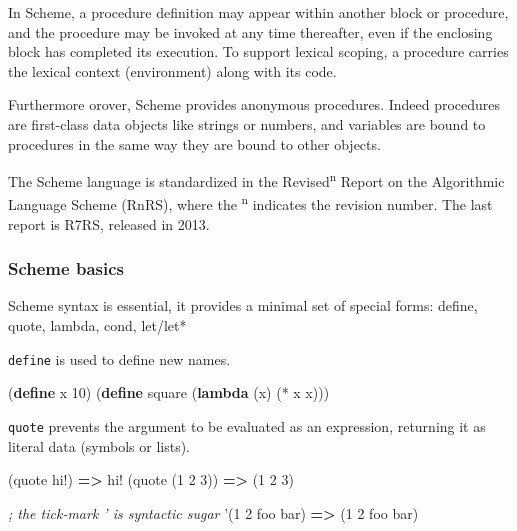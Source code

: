 \documentclass[12pt,a4paper,oneside,openright]{book}
\newenvironment{Shaded}{\begin{snugshade}}{\end{snugshade}}
\newcommand{\KeywordTok}[1]{\textcolor[rgb]{0.13,0.29,0.53}{\textbf{{#1}}}}
\newcommand{\DecValTok}[1]{\textcolor[rgb]{0.00,0.00,0.81}{{#1}}}
\newcommand{\CommentTok}[1]{\textcolor[rgb]{0.56,0.35,0.01}{\textit{{#1}}}}
\newcommand{\FunctionTok}[1]{\textcolor[rgb]{0.00,0.00,0.00}{{#1}}}
\newcommand{\NormalTok}[1]{{#1}}
\begin{document}
In Scheme, a procedure definition may appear within another block or
procedure, and the procedure may be invoked at any time thereafter, even
if the enclosing block has completed its execution. To support lexical
scoping, a procedure carries the lexical context (environment) along
with its code.

Furthermore orover, Scheme provides anonymous procedures. Indeed
procedures are first-class data objects like strings or numbers, and
variables are bound to procedures in the same way they are bound to
other objects.

The Scheme language is standardized in the Revised\textsuperscript{n}
Report on the Algorithmic Language Scheme (RnRS), where the
\textsuperscript{n} indicates the revision number. The last report is
R7RS, released in 2013.

\subsubsection{Scheme basics}\label{scheme-basics}

Scheme syntax is essential, it provides a minimal set of special forms:
define, quote, lambda, cond, let/let*

\texttt{define} is used to define new names.

\begin{Shaded}
\begin{Highlighting}[]
    \NormalTok{(}\KeywordTok{define}\FunctionTok{ x }\DecValTok{10}\NormalTok{)}
    \NormalTok{(}\KeywordTok{define}\FunctionTok{ square }\NormalTok{(}\KeywordTok{lambda} \NormalTok{(x) (* x x)))}
\end{Highlighting}
\end{Shaded}

\texttt{quote} prevents the argument to be evaluated as an expression,
returning it as literal data (symbols or lists).

\begin{Shaded}
\begin{Highlighting}[]
    \NormalTok{(quote hi!)           }\KeywordTok{=>} \NormalTok{hi!}
    \NormalTok{(quote (}\DecValTok{1} \DecValTok{2} \DecValTok{3}\NormalTok{))         }\KeywordTok{=>} \NormalTok{(}\DecValTok{1} \DecValTok{2} \DecValTok{3}\NormalTok{)}

    \CommentTok{; the tick-mark ' is syntactic sugar}
    \NormalTok{'(}\DecValTok{1} \DecValTok{2} \NormalTok{foo bar)          }\KeywordTok{=>} \NormalTok{(}\DecValTok{1} \DecValTok{2} \NormalTok{foo bar)}
\end{Highlighting}
\end{Shaded}
\end{document}

